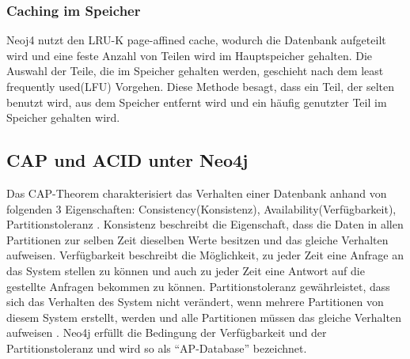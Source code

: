 \subsubsection{Caching im Speicher}
Neoj4 nutzt den LRU-K page-affined cache, wodurch die Datenbank aufgeteilt wird und eine feste Anzahl von Teilen wird im Hauptspeicher gehalten. Die Auswahl der Teile, die im Speicher gehalten werden, geschieht nach dem least frequently used(LFU) Vorgehen. Diese Methode besagt, dass ein Teil, der selten benutzt wird, aus dem Speicher entfernt wird und ein häufig genutzter Teil im Speicher gehalten wird\parencite{robinson2013graph}.
\subsection{CAP und ACID unter Neo4j}
Das CAP-Theorem charakterisiert das Verhalten einer Datenbank anhand von folgenden 3 Eigenschaften: Consistency(Konsistenz), Availability(Verfügbarkeit), Partitionstoleranz \parencite{simon2000brewer}. Konsistenz beschreibt die Eigenschaft, dass die Daten in allen Partitionen zur selben Zeit dieselben Werte besitzen und das gleiche Verhalten aufweisen. Verfügbarkeit beschreibt die Möglichkeit, zu jeder Zeit eine Anfrage an das System stellen zu können und auch zu jeder Zeit eine Antwort auf die gestellte Anfragen bekommen zu können. Partitionstoleranz gewährleistet, dass sich das Verhalten des System nicht verändert, wenn mehrere Partitionen von diesem System erstellt, werden und alle Partitionen müssen das gleiche Verhalten aufweisen  \parencite{simon2000brewer}. Neo4j erfüllt die Bedingung der Verfügbarkeit und der  Partitionstoleranz \parencite{vukotic2015neo4j} und wird so als “AP-Database” bezeichnet. \newline
